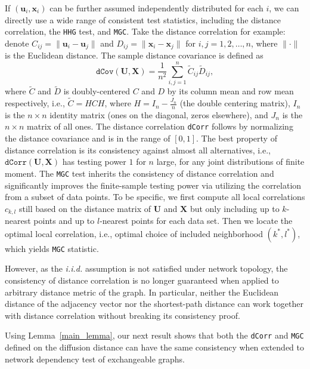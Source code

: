\documentclass[11pt]{article}
\theoremstyle{definition}
\begin{document}
If $(\mathbf{u}_{i}, \mathbf{x}_{i} )$ can be further assumed independently distributed for each $i$, we can directly use a wide range of consistent test statistics, including the distance correlation, the \texttt{HHG} test, and \texttt{MGC}. Take the distance correlation for example: denote $C_{ij} = \parallel \mathbf{u}_{i} - \mathbf{u}_{j} \parallel$ and $D_{ij} = \parallel \mathbf{x}_{i} - \mathbf{x}_{j} \parallel$ for $i,j=1,2, \ldots ,n$, where $\parallel \cdot \parallel$ is the Euclidean distance. The sample distance covariance is defined as 
\begin{equation}	 
\label{eq:dCov}
\texttt{dCov}(\mathbf{U}, \mathbf{X}) = \frac{1}{n^2} \sum\limits_{i,j=1}^{n} \tilde{C}_{ij} \tilde{D}_{ij},
\end{equation}
where $\tilde{C}$ and $\tilde{D}$ is doubly-centered $C$ and $D$ by its column mean and row mean respectively, i.e., $\tilde{C}=HCH$, where $H=I_{n}-\frac{J_{n}}{n}$ (the double centering matrix), $I_n$ is the $n \times n$ identity matrix (ones on the diagonal, zeros elsewhere), and $J_n$ is the $n \times n$ matrix of all ones. The distance correlation \texttt{dCorr} follows by normalizing the distance covariance and is in the range of $[0,1]$. The best property of distance correlation is its consistency against almost all alternatives, i.e., $\texttt{dCorr}(\mathbf{U}, \mathbf{X})$ has testing power $1$ for $n$ large, for any joint distributions of finite moment. The \texttt{MGC} test inherits the consistency of distance correlation and significantly improves the finite-sample testing power via utilizing the correlation from a subset of data points. To be specific, we first compute all local correlations $c_{k,l}$ still based on the distance matrix of $\mathbf{U}$ and $\mathbf{X}$ but only including up to $k$-nearest points and up to $l$-nearest points for each data set. Then we locate the optimal local correlation, i.e., optimal choice of included neighborhood $(k^{*}, l^{*})$, which yields \texttt{MGC} statistic.

However, as the \textit{i.i.d.} assumption is not satisfied under network topology, the consistency of distance correlation is no longer guaranteed when applied to arbitrary distance metric of the graph. In particular, neither the Euclidean distance of the adjacency vector nor the shortest-path distance can work together with distance correlation without breaking its consistency proof. 

Using Lemma~\ref{main_lemma}, our next result shows that both the \texttt{dCorr} and \texttt{MGC} defined on the diffusion distance can have the same consistency when extended to network dependency test of exchangeable graphs.  
\end{document}
